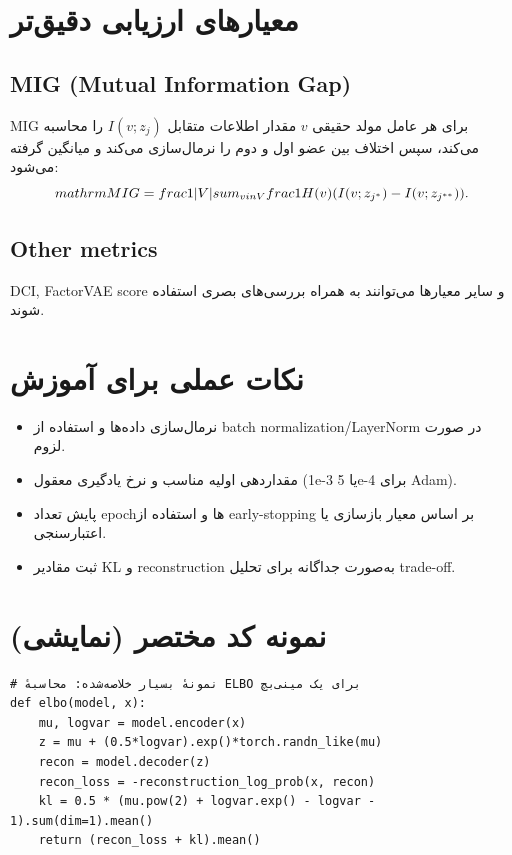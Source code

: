 \section{معیارهای ارزیابی دقیق‌تر}
\subsection{MIG (Mutual Information Gap)}
MIG برای هر عامل مولد حقیقی $v$ مقدار اطلاعات متقابل $I(v; z_j)$ را محاسبه می‌کند، سپس اختلاف بین عضو اول و دوم را نرمال‌سازی می‌کند و میانگین گرفته می‌شود:
$$
\\mathrm{MIG}=\\frac{1}{|V|}\\sum_{v\\in V}\\frac{1}{H(v)}(I(v; z_{j^*})-I(v; z_{j^{**}})).
$$

\subsection{Other metrics}
DCI, FactorVAE score و سایر معیارها می‌توانند به همراه بررسی‌های بصری استفاده شوند.

\section{نکات عملی برای آموزش}
\begin{itemize}
  \item نرمال‌سازی داده‌ها و استفاده از batch normalization/LayerNorm در صورت لزوم.
  \item مقداردهی اولیه مناسب و نرخ یادگیری معقول (1e-3 یا 5e-4 برای Adam).
  \item پایش تعداد epochها و استفاده از early-stopping بر اساس معیار بازسازی یا اعتبارسنجی.
  \item ثبت مقادیر KL و reconstruction به‌صورت جداگانه برای تحلیل trade-off.
\end{itemize}

\section{نمونه کد مختصر (نمایشی)}
\begin{program}[H]
\begin{verbatim}
# نمونهٔ بسیار خلاصه‌شده: محاسبهٔ ELBO برای یک مینی‌بچ
def elbo(model, x):
    mu, logvar = model.encoder(x)
    z = mu + (0.5*logvar).exp()*torch.randn_like(mu)
    recon = model.decoder(z)
    recon_loss = -reconstruction_log_prob(x, recon)
    kl = 0.5 * (mu.pow(2) + logvar.exp() - logvar - 1).sum(dim=1).mean()
    return (recon_loss + kl).mean()
\end{verbatim}
\caption{نمونهٔ سادهٔ محاسبهٔ ELBO}
\end{program}

